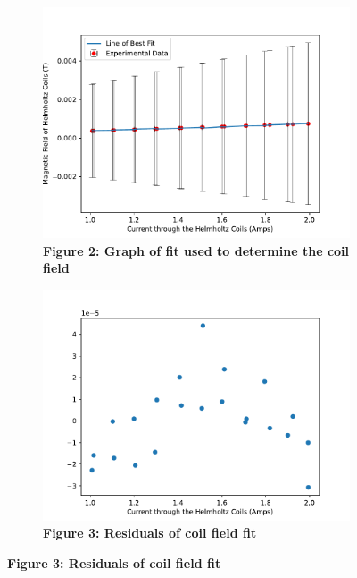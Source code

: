 \documentclass[
	letterpaper, %
	10pt, %
]{CSUniSchoolLabReport}
\begin{document}
\begin{figure}[H]
	\begin{subfigure}{0.45\textwidth}
		\includegraphics[width=\textwidth]{../figures/externalMagneticGraph.pdf}
		\caption{\textbf{Figure 2: Graph of fit used to determine the coil field}}
	\end{subfigure}
	\hspace*{\fill}
	\begin{subfigure}{0.45\textwidth}
		\includegraphics[width=\textwidth]{../figures/externalMagneticResiduals.pdf}
		\caption{\textbf{Figure 3: Residuals of coil field fit}}
	\end{subfigure}
\end{figure}
\end{document}
